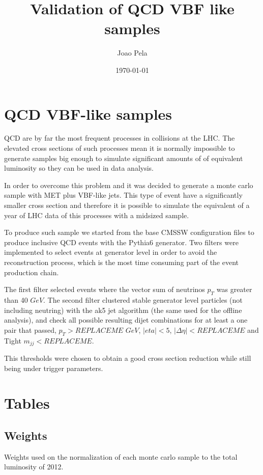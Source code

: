 \documentclass[a4paper,10pt]{article}
\title{Validation of QCD VBF like samples}
\author{Joao Pela}
\date{\today}
\begin{document}
\maketitle

\section{QCD VBF-like samples}

QCD are by far the most frequent processes in collisions at the LHC. The elevated cross sections of such processes mean it is normally impossible to generate samples big enough to simulate 
significant amounts of of equivalent luminosity so they can be used in data analysis. 

In order to overcome this problem and it was decided to generate a monte carlo sample with MET plus VBF-like jets. This type of event have a significantly smaller cross section and therefore
it is possible to simulate the equivalent of a year of LHC data of this processes with a midsized sample.

To produce such sample we started from the base CMSSW configuration files to produce inclusive QCD events with the Pythia6 generator. Two filters were implemented to select events at generator
level in order to avoid the reconstruction process, which is the most time consuming part of the event production chain. 

The first filter selected events where the vector sum of neutrinos $p_T$ was greater than 40 $GeV$. The second filter clustered stable generator level particles (not including neutring) with 
the ak5 jet algorithm (the same used for the offline analysis), and check all possible resulting dijet combinations for at least a one pair that passed, $p_T>REPLACEME$ $GeV$, 
$|eta|<5$, $|\Delta\eta|<REPLACEME$ and Tight $m_{jj} < REPLACEME$.

This thresholds were chosen to obtain a good cross section reduction while still being under trigger parameters. 

\section{Tables}

\subsection{Weights}

Weights used on the normalization of each monte carlo sample to the total luminosity of 2012.
\end{document}
